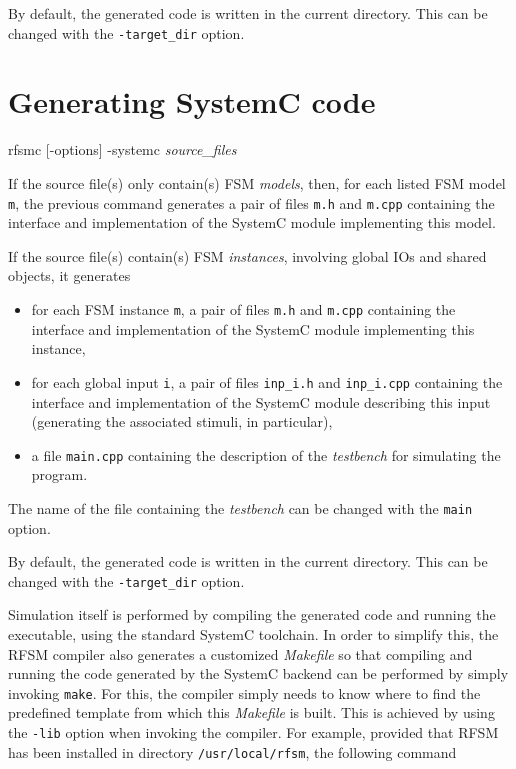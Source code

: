 By default, the generated code is written in the current directory. This can be changed with the
\verb|-target_dir| option.

\section{Generating SystemC code}
\label{sec:gener-syst-code}

\begin{FVerbatim}[commandchars=\\\{\}]
rfsmc [-options] -systemc \emph{source_files}
\end{FVerbatim}

If the source file(s) only contain(s) FSM \emph{models}, then, for each listed FSM model \texttt{m}, 
the previous command generates a pair of files \verb|m.h| and \verb|m.cpp| containing the
  interface and implementation of the SystemC module implementing this model.

\medskip
If the source file(s) contain(s) FSM \emph{instances}, involving global IOs
and shared objects, it generates
\begin{itemize}
\item for each FSM instance \verb|m|, a pair of files \verb|m.h| and \verb|m.cpp| containing the
  interface and implementation of the SystemC module implementing this instance,
\item for each global input \verb|i|, a pair of files \verb|inp_i.h|
  and \verb|inp_i.cpp| containing the interface and implementation of the SystemC module describing
  this input (generating the associated stimuli, in particular),
\item a file \verb|main.cpp| containing the description of the \emph{testbench} for simulating the
  program.
\end{itemize}

The name of the file containing the \emph{testbench} can be changed with the \verb|main| option.

\medskip
By default, the generated code is written in the current directory. This can be changed with the
\verb|-target_dir| option.

\medskip Simulation itself is performed by compiling the generated code and running the executable,
using the standard SystemC toolchain.  In order to simplify this, the RFSM compiler also generates a
customized \emph{Makefile} so that compiling and running the code generated by the SystemC backend
can be performed by simply invoking \verb|make|. For this, the compiler simply needs to know where
to find the predefined template from which this \emph{Makefile} is built. This is achieved by using
the \verb|-lib| option when invoking the compiler. For example, provided that RFSM has been
installed in directory \verb|/usr/local/rfsm|, the following command

